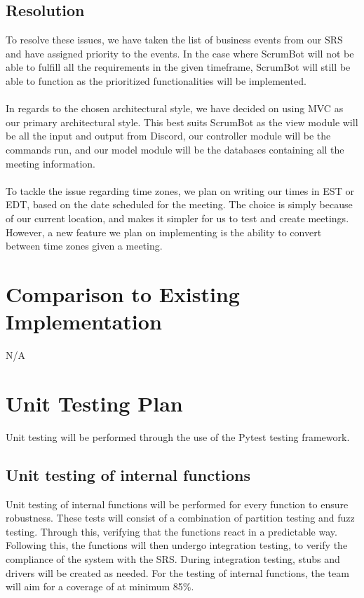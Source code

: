 \documentclass[12pt, titlepage]{article}
\begin{document}
\subsection{Resolution}
To resolve these issues, we have taken the list of business events from our SRS and have assigned priority to the events. In the case where ScrumBot will not be able to fulfill all the requirements in the given timeframe, ScrumBot will still be able to function as the prioritized functionalities will be implemented.\\ \\
\noindent In regards to the chosen architectural style, we have decided on using MVC as our primary architectural style. This best suits ScrumBot as the view module will be all the input and output from Discord, our controller module will be the commands run, and our model module will be the databases containing all the meeting information.\\ \\
\noindent To tackle the issue regarding time zones, we plan on writing our times in EST or EDT, based on the date scheduled for the meeting. The choice is simply because of our current location, and makes it simpler for us to test and create meetings. However, a new feature we plan on implementing is the ability to convert between time zones given a meeting.
	
\section{Comparison to Existing Implementation}
N/A

\section{Unit Testing Plan}
Unit testing will be performed through the use of the Pytest testing framework.

\subsection{Unit testing of internal functions}
Unit testing of internal functions will be performed for every function to ensure robustness. These tests will consist of a combination of partition testing and fuzz testing. Through this, verifying that the functions react in a predictable way. Following this, the functions will then undergo integration testing, to verify the compliance of the system with the SRS. During integration testing, stubs and drivers will be created as needed. For the testing of internal functions, the team will aim for a coverage of at minimum 85\%.
\end{document}
